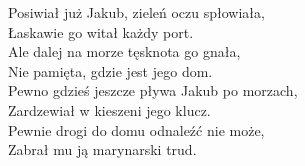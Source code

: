 Posiwiał już Jakub, zieleń oczu spłowiała, \\
Łaskawie go witał każdy port. \\
Ale dalej na morze tęsknota go gnała, \\
Nie pamięta, gdzie jest jego dom. \\
Pewno gdzieś jeszcze pływa Jakub po morzach, \\
Zardzewiał w kieszeni jego klucz. \\
Pewnie drogi do domu odnaleźć nie może, \\
Zabrał mu ją marynarski trud. \\